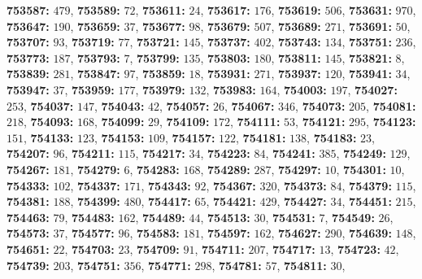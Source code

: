 \textsf{\bfseries 753587:} $479$, \textsf{\bfseries 753589:} $72$, \textsf{\bfseries 753611:} $24$, \textsf{\bfseries 753617:} $176$, \textsf{\bfseries 753619:} $506$, \textsf{\bfseries 753631:} $970$, \textsf{\bfseries 753647:} $190$, \textsf{\bfseries 753659:} $37$, \textsf{\bfseries 753677:} $98$, \textsf{\bfseries 753679:} $507$, \textsf{\bfseries 753689:} $271$, \textsf{\bfseries 753691:} $50$, \textsf{\bfseries 753707:} $93$, \textsf{\bfseries 753719:} $77$, \textsf{\bfseries 753721:} $145$, \textsf{\bfseries 753737:} $402$, \textsf{\bfseries 753743:} $134$, \textsf{\bfseries 753751:} $236$, \textsf{\bfseries 753773:} $187$, \textsf{\bfseries 753793:} $7$, \textsf{\bfseries 753799:} $135$, \textsf{\bfseries 753803:} $180$, \textsf{\bfseries 753811:} $145$, \textsf{\bfseries 753821:} $8$, \textsf{\bfseries 753839:} $281$, \textsf{\bfseries 753847:} $97$, \textsf{\bfseries 753859:} $18$, \textsf{\bfseries 753931:} $271$, \textsf{\bfseries 753937:} $120$, \textsf{\bfseries 753941:} $34$, \textsf{\bfseries 753947:} $37$, \textsf{\bfseries 753959:} $177$, \textsf{\bfseries 753979:} $132$, \textsf{\bfseries 753983:} $164$, \textsf{\bfseries 754003:} $197$, \textsf{\bfseries 754027:} $253$, \textsf{\bfseries 754037:} $147$, \textsf{\bfseries 754043:} $42$, \textsf{\bfseries 754057:} $26$, \textsf{\bfseries 754067:} $346$, \textsf{\bfseries 754073:} $205$, \textsf{\bfseries 754081:} $218$, \textsf{\bfseries 754093:} $168$, \textsf{\bfseries 754099:} $29$, \textsf{\bfseries 754109:} $172$, \textsf{\bfseries 754111:} $53$, \textsf{\bfseries 754121:} $295$, \textsf{\bfseries 754123:} $151$, \textsf{\bfseries 754133:} $123$, \textsf{\bfseries 754153:} $109$, \textsf{\bfseries 754157:} $122$, \textsf{\bfseries 754181:} $138$, \textsf{\bfseries 754183:} $23$, \textsf{\bfseries 754207:} $96$, \textsf{\bfseries 754211:} $115$, \textsf{\bfseries 754217:} $34$, \textsf{\bfseries 754223:} $84$, \textsf{\bfseries 754241:} $385$, \textsf{\bfseries 754249:} $129$, \textsf{\bfseries 754267:} $181$, \textsf{\bfseries 754279:} $6$, \textsf{\bfseries 754283:} $168$, \textsf{\bfseries 754289:} $287$, \textsf{\bfseries 754297:} $10$, \textsf{\bfseries 754301:} $10$, \textsf{\bfseries 754333:} $102$, \textsf{\bfseries 754337:} $171$, \textsf{\bfseries 754343:} $92$, \textsf{\bfseries 754367:} $320$, \textsf{\bfseries 754373:} $84$, \textsf{\bfseries 754379:} $115$, \textsf{\bfseries 754381:} $188$, \textsf{\bfseries 754399:} $480$, \textsf{\bfseries 754417:} $65$, \textsf{\bfseries 754421:} $429$, \textsf{\bfseries 754427:} $34$, \textsf{\bfseries 754451:} $215$, \textsf{\bfseries 754463:} $79$, \textsf{\bfseries 754483:} $162$, \textsf{\bfseries 754489:} $44$, \textsf{\bfseries 754513:} $30$, \textsf{\bfseries 754531:} $7$, \textsf{\bfseries 754549:} $26$, \textsf{\bfseries 754573:} $37$, \textsf{\bfseries 754577:} $96$, \textsf{\bfseries 754583:} $181$, \textsf{\bfseries 754597:} $162$, \textsf{\bfseries 754627:} $290$, \textsf{\bfseries 754639:} $148$, \textsf{\bfseries 754651:} $22$, \textsf{\bfseries 754703:} $23$, \textsf{\bfseries 754709:} $91$, \textsf{\bfseries 754711:} $207$, \textsf{\bfseries 754717:} $13$, \textsf{\bfseries 754723:} $42$, \textsf{\bfseries 754739:} $203$, \textsf{\bfseries 754751:} $356$, \textsf{\bfseries 754771:} $298$, \textsf{\bfseries 754781:} $57$, \textsf{\bfseries 754811:} $30$, 

